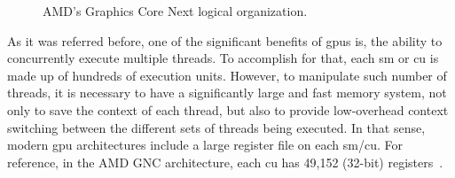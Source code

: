 \begin{figure}[htb]
  \begin{subfigmatrix}{2}
  \end{subfigmatrix}
  \caption{AMD's Graphics Core Next logical organization.}
  \label{fig:Vega10arch}
\end{figure}


As it was referred before, one of the significant benefits of \acrshort{gpu}s is, the ability to concurrently execute multiple threads. To accomplish for that, each \acrshort{sm} or \acrshort{cu} is made up of hundreds of execution units. However, to manipulate such number of threads, it is necessary to have a significantly large and fast memory system, not only to save the context of each thread, but also to provide low-overhead context switching between the different sets of threads being executed. In that sense, modern \acrshort{gpu} architectures include a large register file on each \acrshort{sm}/\acrshort{cu}. For reference, in the AMD GNC architecture, each \acrshort{cu} has 49,152 (32-bit) registers~\cite{jing_energy-efficient_2013}.

